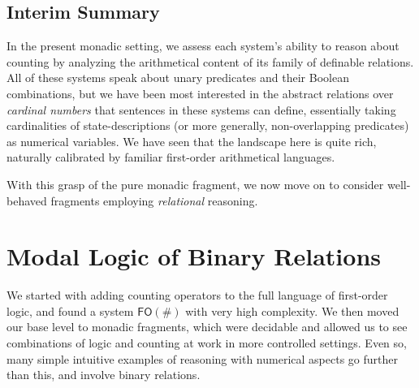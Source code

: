 \documentclass[12pt,oneside,reqno]{amsart}
\theoremstyle{definition}
\begin{document}

\subsection{Interim Summary} %
In the present monadic setting, we assess each system's ability to reason about counting by analyzing the arithmetical content of its family of definable relations. All of these systems speak about unary predicates and their Boolean combinations, but we have been most interested in the abstract relations over \emph{cardinal numbers} that sentences in these systems can define, essentially taking cardinalities of state-descriptions (or more generally, non-overlapping predicates) as numerical variables. We have seen that the landscape here is quite rich, naturally calibrated by familiar first-order arithmetical languages. 

With this grasp of the pure monadic fragment, we now move on to consider well-behaved fragments employing \emph{relational} reasoning. 


\section{Modal Logic of Binary Relations} \label{section:modal}


We started with adding counting operators to the full language of first-order logic, and found a system $\mathsf{FO}(\#)$ with very high complexity. We then moved our base level to monadic fragments, which were decidable and allowed us to see combinations of logic and counting at work in more controlled settings. Even so, many simple intuitive examples of reasoning with numerical aspects go further than this, and involve binary relations. 
\end{document}
